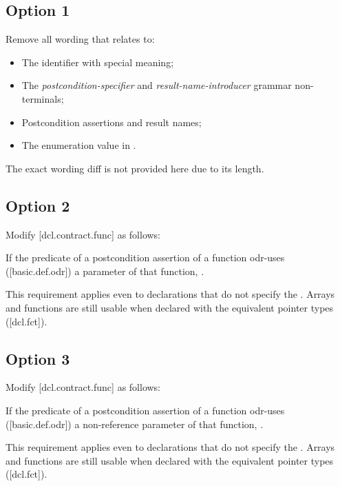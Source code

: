 \subsection{Option 1}

Remove all wording that relates to:
\begin{itemize}
\item The  identifier with special meaning;
\item The \emph{postcondition-specifier} and \emph{result-name-introducer} grammar non-terminals;
\item Postcondition assertions and result names;
\item The  enumeration value in .
\end{itemize}
The exact wording diff is not provided here due to its length.

\subsection{Option 2}

Modify [dcl.contract.func] as follows:

\begin{adjustwidth}{0.5cm}{0.5cm}
If the predicate of a postcondition assertion of a function odr-uses ([basic.def.odr]) a
parameter of that function, .
\begin{note}
This requirement applies even to declarations
that do not specify the . Arrays and functions are still usable when declared with the equivalent pointer types ([dcl.fct]).
\end{note}
\begin{example}
\tcode{[...]}
\end{example}
\end{adjustwidth}

\subsection{Option 3}

Modify [dcl.contract.func] as follows:

\begin{adjustwidth}{0.5cm}{0.5cm}
If the predicate of a postcondition assertion of a function odr-uses ([basic.def.odr]) a
non-reference parameter of that function, .
\begin{note}
This requirement applies even to declarations
that do not specify the . Arrays and functions are still usable when declared with the equivalent pointer types ([dcl.fct]).
\end{note}
\begin{example}
\tcode{[...]}
\end{example}
\end{adjustwidth}

